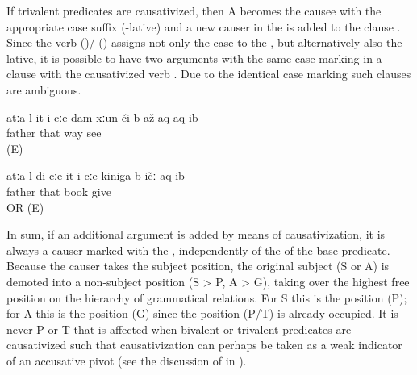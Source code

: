 If trivalent predicates are causativized, then A becomes the causee with the appropriate case suffix (-lative) and a new causer in the  is added to the clause . Since the verb  ()\slash{} ()  assigns not only the  case to the , but alternatively also the -lative, it is possible to have two arguments with the same case marking in a clause with the causativized verb  . Due to the identical case marking such clauses are ambiguous.
%
\begin{exe}
	\ex	\label{ex:Father made him show me the way@61}
	\gll	atːa-l	it-i-cːe	dam	xːun	či-b-až-aq-aq-ib\\
		father	that		way	see\\
	\glt	{} (E)

	\ex	\label{ex:Father made him give me the book}
	\gll	atːa-l	di-cːe	it-i-cːe	kiniga	b-ičː-aq-ib\\
		father		that	book	give\\
	\glt	{} OR  (E)
\end{exe}

In sum, if an additional argument is added by means of causativization, it is always a causer marked with the , independently of the  of the base predicate. Because the causer takes the subject position, the original subject (S or A) is demoted into a non-subject position (S > P, A > G), taking over the highest free position on the hierarchy of grammatical relations. For S this is the  position (P); for A this is the  position (G) since the  position (P/T) is already occupied. It is never P or T that is affected when bivalent or trivalent predicates are causativized such that causativization can perhaps be taken as a weak indicator of an accusative pivot (see the discussion of  in ).

